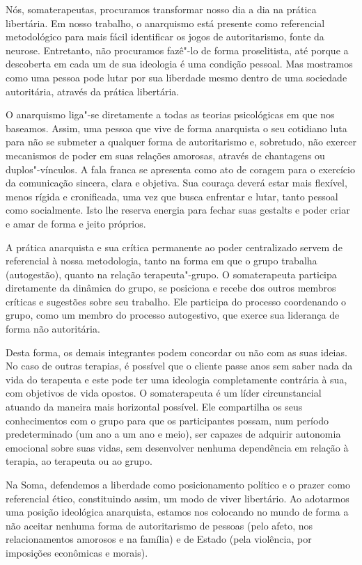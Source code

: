 Nós, somaterapeutas, procuramos transformar nosso dia a dia na prática
libertária. Em nosso trabalho, o anarquismo está presente como
referencial metodológico para mais fácil identificar os jogos de
autoritarismo, fonte da neurose. Entretanto, não procuramos fazê"-lo de
forma proselitista, até porque a descoberta em cada um de sua ideologia
é uma condição pessoal. Mas mostramos como uma pessoa pode lutar por sua
liberdade mesmo dentro de uma sociedade autoritária, através da prática
libertária.

O anarquismo liga"-se diretamente a todas as teorias psicológicas em que
nos baseamos. Assim, uma pessoa que vive de forma anarquista o seu
cotidiano luta para não se submeter a qualquer forma de autoritarismo e,
sobretudo, não exercer mecanismos de poder em suas relações amorosas,
através de chantagens ou duplos"-vínculos. A fala franca se apresenta
como ato de coragem para o exercício da comunicação sincera, clara e
objetiva. Sua couraça deverá estar mais flexível, menos rígida e
cronificada, uma vez que busca enfrentar e lutar, tanto pessoal como
socialmente. Isto lhe reserva energia para fechar suas gestalts e poder criar
e amar de forma e jeito próprios.

A prática anarquista e sua crítica permanente ao poder centralizado
servem de referencial à nossa metodologia, tanto na forma em que o grupo
trabalha (autogestão), quanto na relação terapeuta"-grupo. O
somaterapeuta participa diretamente da dinâmica do grupo, se posiciona e
recebe dos outros membros críticas e sugestões sobre seu trabalho. Ele
participa do processo coordenando o grupo, como um membro do processo
autogestivo, que exerce sua liderança de forma não autoritária.

Desta forma, os demais integrantes podem concordar ou não com as suas
ideias. No caso de outras terapias, é possível que o cliente passe anos
sem saber nada da vida do terapeuta e este pode ter uma ideologia
completamente contrária à sua, com objetivos de vida opostos. O
somaterapeuta é um líder circunstancial atuando da maneira mais
horizontal possível. Ele compartilha os seus conhecimentos com o grupo
para que os participantes possam, num período predeterminado (um ano a
um ano e meio), ser capazes de adquirir autonomia emocional sobre suas
vidas, sem desenvolver nenhuma dependência em relação à terapia, ao
terapeuta ou ao grupo.

Na Soma, defendemos a liberdade como posicionamento político e o prazer
como referencial ético, constituindo assim, um modo de viver libertário.
Ao adotarmos uma posição ideológica anarquista, estamos nos colocando no
mundo de forma a não aceitar nenhuma forma de autoritarismo de pessoas
(pelo afeto, nos relacionamentos amorosos e na família) e de Estado
(pela violência, por imposições econômicas e morais).

